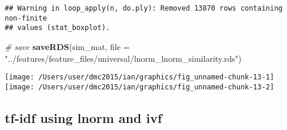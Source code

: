 \documentclass[10pt]{report}
\newenvironment{Shaded}{}{}
\newcommand{\KeywordTok}[1]{\textcolor[rgb]{0.00,0.44,0.13}{\textbf{{#1}}}}
\newcommand{\DataTypeTok}[1]{\textcolor[rgb]{0.56,0.13,0.00}{{#1}}}
\newcommand{\StringTok}[1]{\textcolor[rgb]{0.25,0.44,0.63}{{#1}}}
\newcommand{\CommentTok}[1]{\textcolor[rgb]{0.38,0.63,0.69}{\textit{{#1}}}}
\newcommand{\NormalTok}[1]{{#1}}
\begin{document}
\begin{Shaded}
\end{Shaded}

\begin{verbatim}
## Warning in loop_apply(n, do.ply): Removed 13870 rows containing non-finite
## values (stat_boxplot).
\end{verbatim}

\begin{Shaded}
\begin{Highlighting}[]
\CommentTok{# save}
\KeywordTok{saveRDS}\NormalTok{(sim_mat, }\DataTypeTok{file =} \StringTok{"../features/feature_files/universal/lnorm_lnorm_similarity.rds"}\NormalTok{)}
\end{Highlighting}
\end{Shaded}

\begin{center}\texttt{[image: /Users/user/dmc2015/ian/graphics/fig\_unnamed-chunk-13-1]} \texttt{[image: /Users/user/dmc2015/ian/graphics/fig\_unnamed-chunk-13-2]} \end{center}

\subsection{tf-idf using lnorm and
ivf}\label{tf-idf-using-lnorm-and-ivf}

\begin{Shaded}
\end{Shaded}
\end{document}
